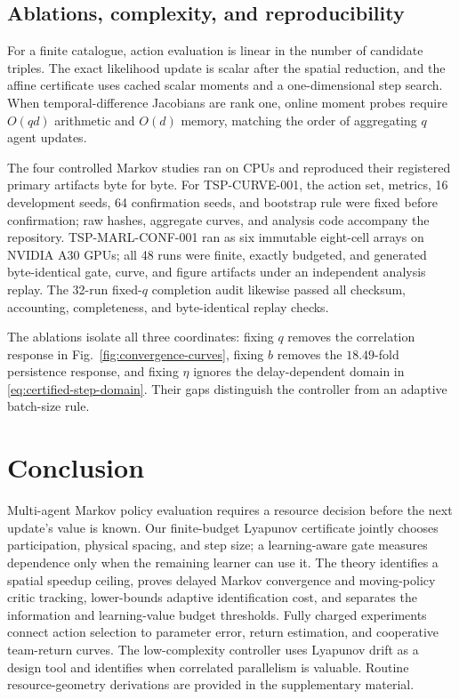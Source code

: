 \documentclass[journal]{IEEEtran}
\begin{document}
\subsection{Ablations, complexity, and reproducibility}
For a finite catalogue, action evaluation is linear in the number of candidate triples.
The exact likelihood update is scalar after the spatial reduction, and the affine certificate uses cached scalar moments and a one-dimensional step search.
When temporal-difference Jacobians are rank one, online moment probes require $O(qd)$ arithmetic and $O(d)$ memory, matching the order of aggregating $q$ agent updates.

The four controlled Markov studies ran on CPUs and reproduced their registered primary artifacts byte for byte.
For TSP-CURVE-001, the action set, metrics, 16 development seeds, 64 confirmation seeds, and bootstrap rule were fixed before confirmation; raw hashes, aggregate curves, and analysis code accompany the repository.
TSP-MARL-CONF-001 ran as six immutable eight-cell arrays on NVIDIA A30 GPUs; all 48 runs were finite, exactly budgeted, and generated byte-identical gate, curve, and figure artifacts under an independent analysis replay.
The 32-run fixed-$q$ completion audit likewise passed all checksum, accounting, completeness, and byte-identical replay checks.

The ablations isolate all three coordinates: fixing $q$ removes the correlation response in Fig.~\ref{fig:convergence-curves}, fixing $b$ removes the $18.49$-fold persistence response, and fixing $\eta$ ignores the delay-dependent domain in \eqref{eq:certified-step-domain}.
Their gaps distinguish the controller from an adaptive batch-size rule.

\section{Conclusion}
Multi-agent Markov policy evaluation requires a resource decision before the next update's value is known.
Our finite-budget Lyapunov certificate jointly chooses participation, physical spacing, and step size; a learning-aware gate measures dependence only when the remaining learner can use it.
The theory identifies a spatial speedup ceiling, proves delayed Markov convergence and moving-policy critic tracking, lower-bounds adaptive identification cost, and separates the information and learning-value budget thresholds.
Fully charged experiments connect action selection to parameter error, return estimation, and cooperative team-return curves.
The low-complexity controller uses Lyapunov drift as a design tool and identifies when correlated parallelism is valuable.
Routine resource-geometry derivations are provided in the supplementary material.

\appendices



\end{document}
